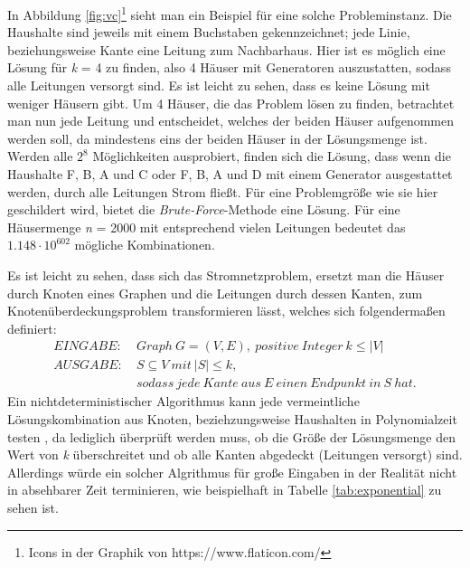 In Abbildung \ref{fig:vc}\footnote{Icons in der Graphik von https://www.flaticon.com/}   sieht man ein Beispiel für eine solche Probleminstanz. Die Haushalte sind jeweils mit einem Buchstaben gekennzeichnet; jede Linie, beziehungsweise Kante eine Leitung zum Nachbarhaus. Hier ist es möglich eine Lösung für \emph{k} = 4 zu finden, also 4 Häuser mit Generatoren auszustatten, sodass alle Leitungen versorgt sind. Es ist leicht zu sehen, dass es keine Lösung mit weniger Häusern gibt. Um 4 Häuser, die das Problem lösen zu finden, betrachtet man nun jede Leitung und entscheidet, welches der beiden Häuser aufgenommen werden soll, da mindestens eins der beiden Häuser in der Lösungsmenge ist. Werden alle $2^{8}$ Möglichkeiten ausprobiert, finden sich die Lösung, dass wenn die Haushalte F, B, A und C oder F, B, A und D mit einem Generator ausgestattet werden, durch alle Leitungen Strom fließt. Für eine Problemgröße wie sie hier geschildert wird, bietet die \emph{Brute-Force}-Methode eine Lösung. Für eine Häusermenge \emph{n} = 2000 mit entsprechend vielen Leitungen bedeutet das $1.148 \cdot 10^{602}$ mögliche Kombinationen. 




Es ist leicht zu sehen, dass sich das Stromnetzproblem, ersetzt man die Häuser durch Knoten eines Graphen und die Leitungen durch dessen Kanten,  zum Knotenüberdeckungsproblem transformieren lässt, welches sich folgendermaßen definiert\cite{trees}:
\begin{align*}
EINGABE: &\ Graph\ G=(V,E),\ positive\ Integer\ k\leq |V|\\
AUSGABE: &\ S\subseteq V\ mit\ |S|\leq k,\\
&\ sodass\ jede\ Kante\ aus\ E\ einen\ Endpunkt\ in\ S\ hat.
\end{align*}
Ein nichtdeterministischer Algorithmus kann jede vermeintliche Lösungskombination aus Knoten, beziehzungsweise Haushalten in Polynomialzeit testen \cite{intract}, da lediglich überprüft werden muss, ob die Größe der Lösungsmenge den Wert von \emph{k} überschreitet und ob alle Kanten abgedeckt (Leitungen versorgt) sind.
 Allerdings würde ein solcher Algrithmus für große Eingaben in der Realität nicht in absehbarer Zeit terminieren, wie beispielhaft in Tabelle \ref{tab:exponential} zu sehen ist.
 
